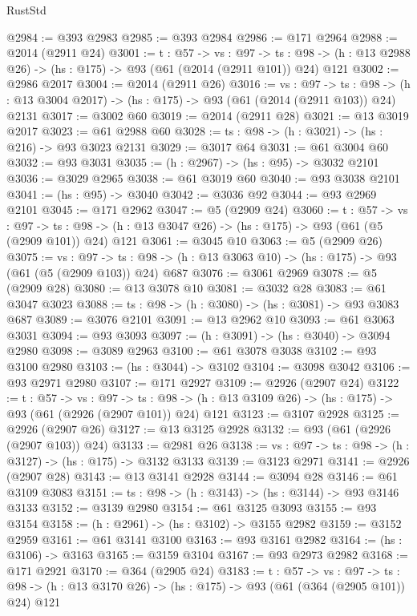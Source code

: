 \begin{lexlean}{RustStd}
\begin{coremodule}
{\begin{coremodule}
{{{{{{{{{@2984 := @393 @2983
@2985 := @393 @2984
@2986 := @171 @2964
@2988 := @2014 (@2911 @24)
@3001 := {t : @57} ->
  {vs : @97} ->
  {ts : @98} -> (h : @13 @2988 @26) -> (hs : @175) -> @93 (@61 (@2014 (@2911 @101)) @24) @121
@3002 := @2986 @2017
@3004 := @2014 (@2911 @26)
@3016 := {vs : @97} ->
  {ts : @98} -> (h : @13 @3004 @2017) -> (hs : @175) -> @93 (@61 (@2014 (@2911 @103)) @24) @2131
@3017 := @3002 @60
@3019 := @2014 (@2911 @28)
@3021 := @13 @3019 @2017
@3023 := @61 @2988 @60
@3028 := {ts : @98} -> (h : @3021) -> (hs : @216) -> @93 @3023 @2131
@3029 := @3017 @64
@3031 := @61 @3004 @60
@3032 := @93 @3031
@3035 := (h : @2967) -> (hs : @95) -> @3032 @2101
@3036 := @3029 @2965
@3038 := @61 @3019 @60
@3040 := @93 @3038 @2101
@3041 := (hs : @95) -> @3040
@3042 := @3036 @92
@3044 := @93 @2969 @2101
@3045 := @171 @2962
@3047 := @5 (@2909 @24)
@3060 := {t : @57} ->
  {vs : @97} ->
  {ts : @98} -> (h : @13 @3047 @26) -> (hs : @175) -> @93 (@61 (@5 (@2909 @101)) @24) @121
@3061 := @3045 @10
@3063 := @5 (@2909 @26)
@3075 := {vs : @97} ->
  {ts : @98} -> (h : @13 @3063 @10) -> (hs : @175) -> @93 (@61 (@5 (@2909 @103)) @24) @687
@3076 := @3061 @2969
@3078 := @5 (@2909 @28)
@3080 := @13 @3078 @10
@3081 := @3032 @28
@3083 := @61 @3047 @3023
@3088 := {ts : @98} -> (h : @3080) -> (hs : @3081) -> @93 @3083 @687
@3089 := @3076 @2101
@3091 := @13 @2962 @10
@3093 := @61 @3063 @3031
@3094 := @93 @3093
@3097 := (h : @3091) -> (hs : @3040) -> @3094 @2980
@3098 := @3089 @2963
@3100 := @61 @3078 @3038
@3102 := @93 @3100 @2980
@3103 := (hs : @3044) -> @3102
@3104 := @3098 @3042
@3106 := @93 @2971 @2980
@3107 := @171 @2927
@3109 := @2926 (@2907 @24)
@3122 := {t : @57} ->
  {vs : @97} ->
  {ts : @98} -> (h : @13 @3109 @26) -> (hs : @175) -> @93 (@61 (@2926 (@2907 @101)) @24) @121
@3123 := @3107 @2928
@3125 := @2926 (@2907 @26)
@3127 := @13 @3125 @2928
@3132 := @93 (@61 (@2926 (@2907 @103)) @24)
@3133 := @2981 @26
@3138 := {vs : @97} -> {ts : @98} -> (h : @3127) -> (hs : @175) -> @3132 @3133
@3139 := @3123 @2971
@3141 := @2926 (@2907 @28)
@3143 := @13 @3141 @2928
@3144 := @3094 @28
@3146 := @61 @3109 @3083
@3151 := {ts : @98} -> (h : @3143) -> (hs : @3144) -> @93 @3146 @3133
@3152 := @3139 @2980
@3154 := @61 @3125 @3093
@3155 := @93 @3154
@3158 := (h : @2961) -> (hs : @3102) -> @3155 @2982
@3159 := @3152 @2959
@3161 := @61 @3141 @3100
@3163 := @93 @3161 @2982
@3164 := (hs : @3106) -> @3163
@3165 := @3159 @3104
@3167 := @93 @2973 @2982
@3168 := @171 @2921
@3170 := @364 (@2905 @24)
@3183 := {t : @57} ->
  {vs : @97} ->
  {ts : @98} -> (h : @13 @3170 @26) -> (hs : @175) -> @93 (@61 (@364 (@2905 @101)) @24) @121
}}}}}}}}}
\end{coremodule}}
\end{coremodule}
\end{lexlean}
